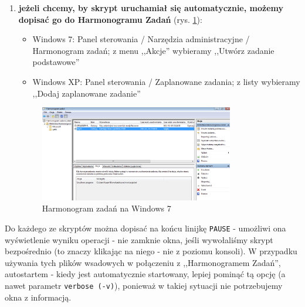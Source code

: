 \begin{enumerate}
\item \textbf{jeżeli chcemy, by skrypt uruchamiał się automatycznie, możemy dopisać go do Harmonogramu Zadań} (rys. \ref{harm}):
\begin{itemize}
\item Windows 7: Panel sterowania / Narzędzia administracyjne / Harmonogram zadań; z menu ,,Akcje'' wybieramy ,,Utwórz zadanie podstawowe''
\item Windows XP: Panel sterowania / Zaplanowane zadania; z listy wybieramy ,,Dodaj zaplanowane zadanie''
\end{itemize}
\begin{figure}[h!]
	\centering
	\includegraphics[width=0.8\textwidth]{../img/harmon.jpg}
	\caption{Harmonogram zadań na Windows 7}
	\label{harm}
\end{figure}

\end{enumerate}

Do każdego ze skryptów można dopisać na końcu linijkę \verb|PAUSE| - umożliwi ona wyświetlenie wyniku operacji - nie zamknie okna, jeśli wywołaliśmy skrypt bezpośrednio (to znaczy klikając na niego - nie z poziomu konsoli). W przypadku używania tych plików wsadowych w połączeniu z ,,Harmonogramem Zadań'', autostartem - kiedy jest automatycznie startowany, lepiej pominąć tą opcję (a nawet parametr \verb|verbose (-v)|), ponieważ w takiej sytuacji nie potrzebujemy okna z informacją. 

